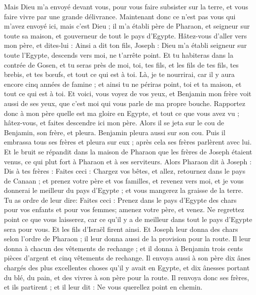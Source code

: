 \begin{multicols}{2}
Mais Dieu m'a envoyé devant vous, pour vous faire subsister sur la terre, et vous faire vivre par une grande délivrance.
Maintenant donc ce n'est pas vous qui m'avez envoyé ici, mais c'est Dieu ; il m'a établi père de Pharaon, et seigneur sur toute sa maison, et gouverneur de tout le pays d'Egypte.
Hâtez-vous d'aller vers mon père, et dites-lui : Ainsi a dit ton fils, Joseph : Dieu m'a établi seigneur sur toute l'Egypte, descends vers moi, ne t'arrête point.
Et tu habiteras dans la contrée de Gosen, et tu seras près de moi, toi, tes fils, et les fils de tes fils, tes brebis, et tes bœufs, et tout ce qui est à toi.
Là, je te nourrirai, car il y aura encore cinq années de famine ; et ainsi tu ne périras point, toi et ta maison, et tout ce qui est à toi.
Et voici, vous voyez de vos yeux, et Benjamin mon frère voit aussi de ses yeux, que c'est moi qui vous parle de ma propre bouche.
Rapportez donc à mon père quelle est ma gloire en Egypte, et tout ce que vous avez vu ; hâtez-vous, et faites descendre ici mon père.
Alors il se jeta sur le cou de Benjamin, son frère, et pleura. Benjamin pleura aussi sur son cou.
Puis il embrassa tous ses frères et pleura sur eux ; après cela ses frères parlèrent avec lui.
Et le bruit se répandit dans la maison de Pharaon que les frères de Joseph étaient venus, ce qui plut fort à Pharaon et à ses serviteurs.
Alors Pharaon dit à Joseph : Dis à tes frères : Faites ceci : Chargez vos bêtes, et allez, retournez dans le pays de Canaan ;
et prenez votre père et vos familles, et revenez vers moi, et je vous donnerai le meilleur du pays d'Egypte ; et vous mangerez la graisse de la terre.
Tu as ordre de leur dire: Faites ceci : Prenez dans le pays d’Egypte des chars pour vos enfants et pour vos femmes; amenez votre père, et venez.
Ne regrettez point ce que vous laisserez, car ce qu’il y a de meilleur dans tout le pays d’Egypte sera pour vous.
Et les fils d'Israël firent ainsi. Et Joseph leur donna des chars selon l'ordre de Pharaon ; il leur donna aussi de la provision pour la route.
Il leur donna à chacun des vêtements de rechange ; et il donna à Benjamin trois cents pièces d'argent et cinq vêtements de rechange.
Il envoya aussi à son père dix ânes chargés des plus excellentes choses qu'il y avait en Egypte, et dix ânesses portant du blé, du pain, et des vivres à son père pour la route.
Il renvoya donc ses frères, et ils partirent ; et il leur dit : Ne vous querellez point en chemin.

\end{multicols}
